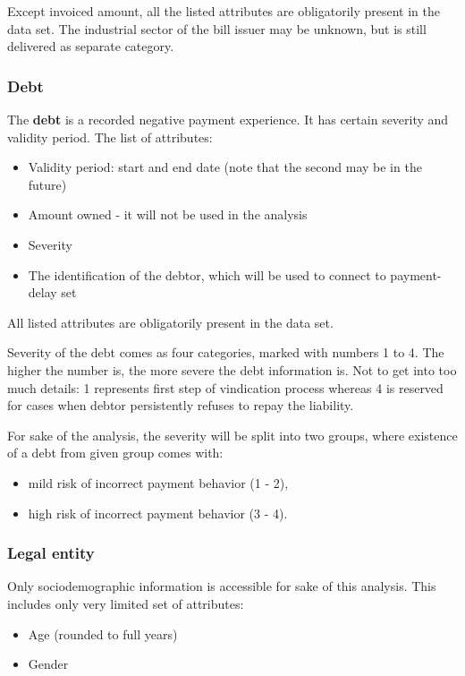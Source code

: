\documentclass{article}
\begin{document}
Except invoiced amount, all the listed attributes are obligatorily present in the data set.
The industrial sector of the bill issuer may be unknown, but is still delivered as separate category.

\subsubsection{Debt}
\label{section:intro-debt}

The \textbf{debt} is a recorded negative payment experience.
It has certain severity and validity period.
The list of attributes:
\begin{itemize}
    \item Validity period: start and end date (note that the second may be in the future)
    \item Amount owned - it will not be used in the analysis
    \item Severity
    \item The identification of the debtor, which will be used to connect to payment-delay set
\end{itemize}

All listed attributes are obligatorily present in the data set.\par
Severity of the debt comes as four categories, marked with numbers 1 to 4. The higher the number is,
the more severe the debt information is. Not to get into too much details:
1 represents first step of vindication process whereas 4 is reserved for cases when
debtor persistently refuses to repay the liability.\par
For sake of the analysis, the severity will be split into two groups, where existence of a debt from given group comes with:
\begin{itemize}
    \item mild risk of incorrect payment behavior (1 - 2),
    \item high risk of incorrect payment behavior (3 - 4).
\end{itemize}

\subsubsection{Legal entity}

Only sociodemographic information is accessible for sake of this analysis. 
This includes only very limited set of attributes:

\begin{itemize}
    \item Age (rounded to full years)
    \item Gender
\end{itemize}
\end{document}
